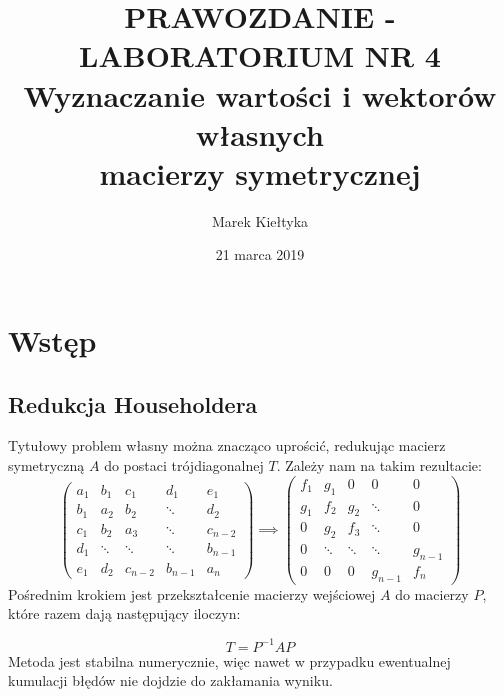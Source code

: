 

\title{\Large\vspace{-2.5cm}{\Huge S}PRAWOZDANIE - LABORATORIUM NR {\Huge4}\\
		\textbf{Wyznaczanie wartości i wektorów własnych\\ macierzy symetrycznej} } 
\date{\Large21 marca 2019}
\author{\Large Marek Kiełtyka}


\maketitle

\section{Wstęp}
	
\subsection{Redukcja Householdera}

Tytułowy problem własny można znacząco uprościć, redukując macierz symetryczną $ A $ do postaci trójdiagonalnej $ T $. Zależy nam na takim rezultacie:
\begin{equation}
\begin{pmatrix}
a_1 & b_1 & c_1 & d_1 & e_1 \\ 
b_1 & a_2 & b_2 & \ddots & d_2 \\
c_1 & b_2 & a_3 & \ddots & c_{n-2} \\
d_1 & \ddots & \ddots & \ddots& b_{n-1}\\
e_1 & d_2 & c_{n-2} & b_{n-1} & a_n
\end{pmatrix}
\implies
\begin{pmatrix}
f_1 & g_1 & 0 & 0 & 0 \\ 
g_1 &f_2 &g_2 & \ddots & 0 \\
0 & g_2 & f_3 & \ddots & 0 \\
0 & \ddots & \ddots & \ddots& g_{n-1}\\
0 & 0 &0 & g_{n-1} &f_n
\end{pmatrix}
\label{przejscie}
\end{equation}
Pośrednim krokiem jest przekształcenie macierzy wejściowej $ A $ do macierzy $ P $, które razem dają następujący iloczyn:

\begin{equation}
T = P^{-1}AP
\label{tpap}
\end{equation}
Metoda jest stabilna numerycznie, więc nawet w przypadku ewentualnej kumulacji błędów nie dojdzie do zakłamania wyniku.

